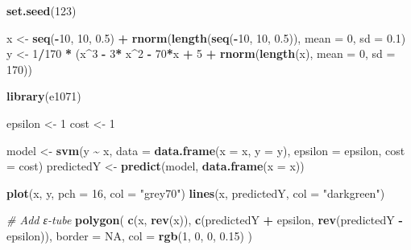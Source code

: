 \documentclass[
]{article}
\newenvironment{Shaded}{\begin{snugshade}}{\end{snugshade}}
\newcommand{\AttributeTok}[1]{\textcolor[rgb]{0.13,0.29,0.53}{#1}}
\newcommand{\CommentTok}[1]{\textcolor[rgb]{0.56,0.35,0.01}{\textit{#1}}}
\newcommand{\ConstantTok}[1]{\textcolor[rgb]{0.56,0.35,0.01}{#1}}
\newcommand{\DecValTok}[1]{\textcolor[rgb]{0.00,0.00,0.81}{#1}}
\newcommand{\FloatTok}[1]{\textcolor[rgb]{0.00,0.00,0.81}{#1}}
\newcommand{\FunctionTok}[1]{\textcolor[rgb]{0.13,0.29,0.53}{\textbf{#1}}}
\newcommand{\NormalTok}[1]{#1}
\newcommand{\OtherTok}[1]{\textcolor[rgb]{0.56,0.35,0.01}{#1}}
\newcommand{\SpecialCharTok}[1]{\textcolor[rgb]{0.81,0.36,0.00}{\textbf{#1}}}
\newcommand{\StringTok}[1]{\textcolor[rgb]{0.31,0.60,0.02}{#1}}
\begin{document}
\begin{Shaded}
\begin{Highlighting}[]
\FunctionTok{set.seed}\NormalTok{(}\DecValTok{123}\NormalTok{)}


\NormalTok{x }\OtherTok{\textless{}{-}} \FunctionTok{seq}\NormalTok{(}\SpecialCharTok{{-}}\DecValTok{10}\NormalTok{, }\DecValTok{10}\NormalTok{, }\FloatTok{0.5}\NormalTok{) }\SpecialCharTok{+} \FunctionTok{rnorm}\NormalTok{(}\FunctionTok{length}\NormalTok{(}\FunctionTok{seq}\NormalTok{(}\SpecialCharTok{{-}}\DecValTok{10}\NormalTok{, }\DecValTok{10}\NormalTok{, }\FloatTok{0.5}\NormalTok{)), }\AttributeTok{mean =} \DecValTok{0}\NormalTok{, }\AttributeTok{sd =} \FloatTok{0.1}\NormalTok{)}
\NormalTok{y }\OtherTok{\textless{}{-}} \DecValTok{1}\SpecialCharTok{/}\DecValTok{170} \SpecialCharTok{*}\NormalTok{ (x}\SpecialCharTok{\^{}}\DecValTok{3} \SpecialCharTok{{-}} \DecValTok{3}\SpecialCharTok{*}\NormalTok{ x}\SpecialCharTok{\^{}}\DecValTok{2} \SpecialCharTok{{-}} \DecValTok{70}\SpecialCharTok{*}\NormalTok{x }\SpecialCharTok{+} \DecValTok{5} \SpecialCharTok{+} \FunctionTok{rnorm}\NormalTok{(}\FunctionTok{length}\NormalTok{(x), }\AttributeTok{mean =} \DecValTok{0}\NormalTok{, }\AttributeTok{sd =} \DecValTok{170}\NormalTok{))}

\FunctionTok{library}\NormalTok{(e1071)}

\NormalTok{epsilon }\OtherTok{\textless{}{-}} \DecValTok{1}
\NormalTok{cost }\OtherTok{\textless{}{-}} \DecValTok{1}

\NormalTok{model }\OtherTok{\textless{}{-}} \FunctionTok{svm}\NormalTok{(y }\SpecialCharTok{\textasciitilde{}}\NormalTok{ x, }\AttributeTok{data =} \FunctionTok{data.frame}\NormalTok{(}\AttributeTok{x =}\NormalTok{ x, }\AttributeTok{y =}\NormalTok{ y), }\AttributeTok{epsilon =}\NormalTok{ epsilon, }\AttributeTok{cost =}\NormalTok{ cost)}
\NormalTok{predictedY }\OtherTok{\textless{}{-}} \FunctionTok{predict}\NormalTok{(model, }\FunctionTok{data.frame}\NormalTok{(}\AttributeTok{x =}\NormalTok{ x))}

\FunctionTok{plot}\NormalTok{(x, y, }\AttributeTok{pch =} \DecValTok{16}\NormalTok{, }\AttributeTok{col =} \StringTok{"grey70"}\NormalTok{)}
\FunctionTok{lines}\NormalTok{(x, predictedY, }\AttributeTok{col =} \StringTok{"darkgreen"}\NormalTok{)}


\CommentTok{\# Add ε{-}tube}
\FunctionTok{polygon}\NormalTok{(}
 \FunctionTok{c}\NormalTok{(x, }\FunctionTok{rev}\NormalTok{(x)),}
 \FunctionTok{c}\NormalTok{(predictedY }\SpecialCharTok{+}\NormalTok{ epsilon, }\FunctionTok{rev}\NormalTok{(predictedY }\SpecialCharTok{{-}}\NormalTok{ epsilon)),}
 \AttributeTok{border =} \ConstantTok{NA}\NormalTok{,}
 \AttributeTok{col =} \FunctionTok{rgb}\NormalTok{(}\DecValTok{1}\NormalTok{, }\DecValTok{0}\NormalTok{, }\DecValTok{0}\NormalTok{, }\FloatTok{0.15}\NormalTok{)}
\NormalTok{)}


\end{Highlighting}
\end{Shaded}
\end{document}
